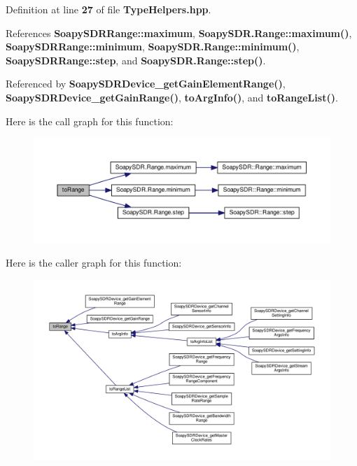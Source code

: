 Definition at line {\bf 27} of file {\bf Type\+Helpers.\+hpp}.



References {\bf Soapy\+S\+D\+R\+Range\+::maximum}, {\bf Soapy\+S\+D\+R.\+Range\+::maximum()}, {\bf Soapy\+S\+D\+R\+Range\+::minimum}, {\bf Soapy\+S\+D\+R.\+Range\+::minimum()}, {\bf Soapy\+S\+D\+R\+Range\+::step}, and {\bf Soapy\+S\+D\+R.\+Range\+::step()}.



Referenced by {\bf Soapy\+S\+D\+R\+Device\+\_\+get\+Gain\+Element\+Range()}, {\bf Soapy\+S\+D\+R\+Device\+\_\+get\+Gain\+Range()}, {\bf to\+Arg\+Info()}, and {\bf to\+Range\+List()}.



Here is the call graph for this function\+:
\nopagebreak
\begin{figure}[H]
\begin{center}
\leavevmode
\includegraphics[width=350pt]{d9/dec/TypeHelpers_8hpp_ae2f79acc3f690bce03e00e58316059c8_cgraph}
\end{center}
\end{figure}




Here is the caller graph for this function\+:
\nopagebreak
\begin{figure}[H]
\begin{center}
\leavevmode
\includegraphics[width=350pt]{d9/dec/TypeHelpers_8hpp_ae2f79acc3f690bce03e00e58316059c8_icgraph}
\end{center}
\end{figure}


